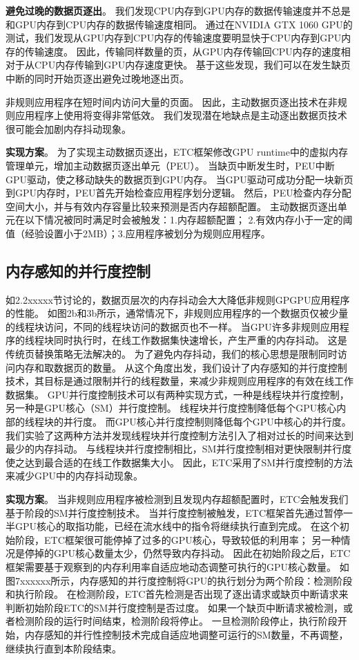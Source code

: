 \textbf{避免过晚的数据页逐出}。
我们发现CPU内存到GPU内存的数据传输速度并不总是和GPU内存到CPU内存的数据传输速度相同。
通过在NVIDIA GTX 1060 GPU的测试，我们发现从GPU内存到CPU内存的传输速度要明显快于CPU内存到GPU内存的传输速度。
因此，传输同样数量的页，从GPU内存传输回CPU内存的速度相对于从CPU内存传输到GPU内存速度更快。
基于这些发现，我们可以在发生缺页中断的同时开始页逐出避免过晚地逐出页。

非规则应用程序在短时间内访问大量的页面。
因此，主动数据页逐出技术在非规则应用程序上使用将变得非常低效。
我们发现潜在地缺点是主动逐出数据页技术很可能会加剧内存抖动现象。

\textbf{实现方案}。
为了实现主动数据页逐出，ETC框架修改GPU runtime中的虚拟内存管理单元，增加主动数据页逐出单元（PEU）。
当缺页中断发生时，PEU中断GPU驱动，使之移动缺失的数据页到GPU内存。
当GPU驱动可成功分配一块新页到GPU内存时，PEU首先开始检查应用程序划分逻辑。
然后，PEU检查内存分配空间大小，并与有效内存容量比较来预测是否内存超额配置。
主动数据页逐出单元在以下情况被同时满足时会被触发：1.内存超额配置； 2.有效内存小于一定的阈值（经验设置小于2MB）；3.应用程序被划分为规则应用程序。


\subsection{内存感知的并行度控制}

如2.2xxxxx节讨论的，数据页层次的内存抖动会大大降低非规则GPGPU应用程序的性能。
如图2b和3b所示，通常情况下，非规则应用程序的一个数据页仅被少量的线程块访问，不同的线程块访问的数据页也不一样。
当GPU许多非规则应用程序的线程块同时执行时，在线工作数据集快速增长，产生严重的内存抖动。
这是传统页替换策略无法解决的。
为了避免内存抖动，我们的核心思想是限制同时访问内存和取数据页的数量。
从这个角度出发，我们设计了内存感知的并行度控制技术，其目标是通过限制并行的线程数量，来减少非规则应用程序的有效在线工作数据集。
GPU并行度控制技术可以有两种实现方式，一种是线程块并行度控制，另一种是GPU核心（SM）并行度控制。
线程块并行度控制降低每个GPU核心内部的线程块的并行度。
而GPU核心并行度控制则降低每个GPU中核心的并行度。
我们实验了这两种方法并发现线程块并行度控制方法引入了相对过长的时间来达到最少的内存抖动。
与线程块并行度控制相比，SM并行度控制相对更快限制并行度使之达到最合适的在线工作数据集大小。
因此，ETC采用了SM并行度控制的方法来减少GPU中的内存抖动现象。

\textbf{实现方案}。
当非规则应用程序被检测到且发现内存超额配置时，ETC会触发我们基于阶段的SM并行度控制技术。
当并行度控制被触发，ETC框架首先通过暂停一半GPU核心的取指功能，已经在流水线中的指令将继续执行直到完成。
在这个初始阶段，ETC框架很可能停掉了过多的GPU核心，导致较低的利用率；
另一种情况是停掉的GPU核心数量太少，仍然导致内存抖动。
因此在初始阶段之后，ETC框架需要基于观察到的内存利用率自适应地动态调整可执行的GPU核心数量。
如图7xxxxxx所示，内存感知的并行度控制将GPU的执行划分为两个阶段：检测阶段和执行阶段。
在检测阶段，ETC首先检测是否出现了逐出请求或缺页中断请求来判断初始阶段ETC的SM并行度控制是否过度。
如果一个缺页中断请求被检测，或者检测阶段的运行时间结束，检测阶段将停止。
一旦检测阶段停止，执行阶段开始，内存感知的并行性控制技术完成自适应地调整可运行的SM数量，不再调整，继续执行直到本阶段结束。

